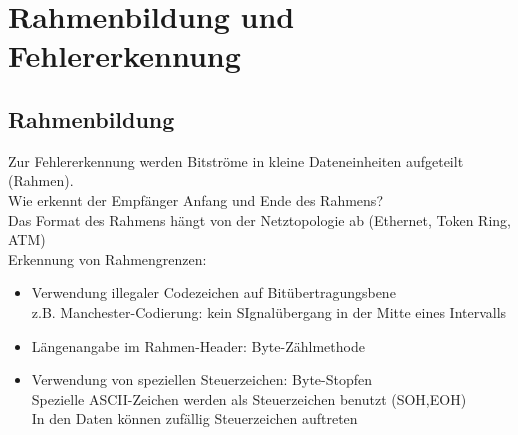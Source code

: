 \documentclass{scrreprt}
\begin{document}
\section{Rahmenbildung und Fehlererkennung}
\subsection{Rahmenbildung}
Zur Fehlererkennung werden Bitströme in kleine Dateneinheiten aufgeteilt (Rahmen).
\\Wie erkennt der Empfänger Anfang und Ende des Rahmens?
\\Das Format des Rahmens hängt von der Netztopologie ab (Ethernet, Token Ring, ATM)
\\Erkennung von Rahmengrenzen:
\begin{itemize}
	\item Verwendung illegaler Codezeichen auf Bitübertragungsbene
	\\z.B. Manchester-Codierung: kein SIgnalübergang in der Mitte eines Intervalls
	\item Längenangabe im Rahmen-Header: Byte-Zählmethode
	\item Verwendung von speziellen Steuerzeichen: Byte-Stopfen
	\\ Spezielle ASCII-Zeichen werden als Steuerzeichen benutzt (SOH,EOH)
	\\In den Daten können zufällig Steuerzeichen auftreten
\end{itemize}
\end{document}
